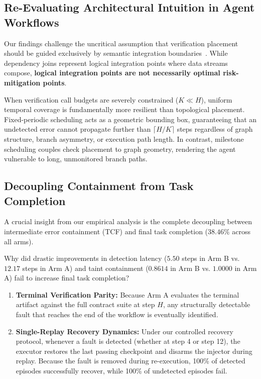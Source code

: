 \subsection{Re-Evaluating Architectural Intuition in Agent Workflows}
Our findings challenge the uncritical assumption that verification placement should be guided exclusively by semantic integration boundaries~\citep{afoud2026vreact,shoham2026jevact}. While dependency joins represent logical integration points where data streams compose, \textbf{logical integration points are not necessarily optimal risk-mitigation points}. 

When verification call budgets are severely constrained ($K \ll H$), uniform temporal coverage is fundamentally more resilient than topological placement. Fixed-periodic scheduling acts as a geometric bounding box, guaranteeing that an undetected error cannot propagate further than $\lceil H/K \rceil$ steps regardless of graph structure, branch asymmetry, or execution path length. In contrast, milestone scheduling couples check placement to graph geometry, rendering the agent vulnerable to long, unmonitored branch paths.

\subsection{Decoupling Containment from Task Completion}
A crucial insight from our empirical analysis is the complete decoupling between intermediate error containment (TCF) and final task completion ($38.46\%$ across all arms). 

Why did drastic improvements in detection latency ($5.50$ steps in Arm B vs. $12.17$ steps in Arm A) and taint containment ($0.8614$ in Arm B vs. $1.0000$ in Arm A) fail to increase final task completion?
\begin{enumerate}
    \item \textbf{Terminal Verification Parity:} Because Arm A evaluates the terminal artifact against the full contract suite at step $H$, any structurally detectable fault that reaches the end of the workflow is eventually identified.
    \item \textbf{Single-Replay Recovery Dynamics:} Under our controlled recovery protocol, whenever a fault is detected (whether at step 4 or step 12), the executor restores the last passing checkpoint and disarms the injector during replay. Because the fault is removed during re-execution, 100\% of detected episodes successfully recover, while 100\% of undetected episodes fail.
\end{enumerate}

